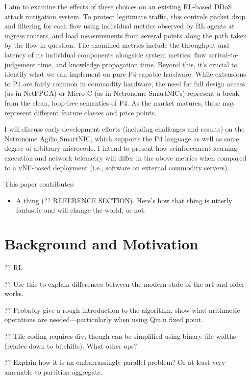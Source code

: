 \documentclass[sigconf,natbib=false]{acmart}
\begin{document}
I aim to examine the effects of these choices on an existing RL-based DDoS attack mitigation system. To protect legitimate traffic, this controls packet drop and filtering for each flow using individual metrics observed by RL agents at ingress routers, and load measurements from several points along the path taken by the flow in question. The examined metrics include the throughput and latency of its individual components alongside system metrics: flow arrival-to-judgement time, and knowledge propagation time. Beyond this, it's crucial to identify what we can implement on pure P4-capable hardware. While extensions to P4 are fairly common in commodity hardware, the need for full design access (as in NetFPGA) or Micro-C (as in Netronome SmartNICs) represent a break from the clean, loop-free semantics of P4. As the market matures, these may represent different feature classes and price points.

I will discuss early development efforts (including challenges and results) on the Netronome Agilio SmartNIC, which supports the P4 language as well as some degree of arbitrary microcode. I intend to present how reinforcement learning execution and network telemetry will differ in the above metrics when compared to a vNF-based deployment (i.e., software on external commodity servers).

This paper contributes:
\begin{itemize}
	\item A thing (?? REFERENCE SECTION). Here's how that thing is utterly fantastic and will change the world, or not.
\end{itemize}

\section{Background and Motivation}\label{sec:motivation}
?? RL~\parencite{RL2E}

?? Use this to explain differences between the modern state of the art and older works.

?? Probably give a rough introduction to the algorithm, show what arithmetic operations are needed---particularly when using Qm.n fixed point.

?? Tile coding requires div, though can be simplified using binary tile widths (relates down to bitshifts). What other ops?

?? Explain how it is an embarrassingly parallel problem? Or at least very amenable to partition-aggregate.
\end{document}
